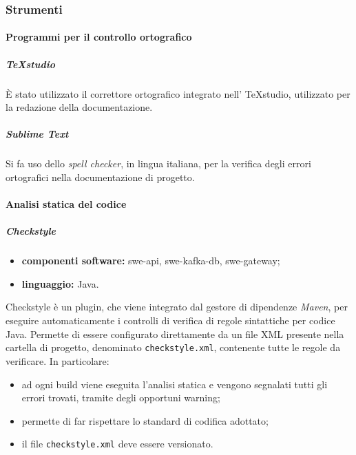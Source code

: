         \subsubsection{Strumenti}

            \paragraph{Programmi per il controllo ortografico}

                \subparagraph{TeXstudio}
                	È stato utilizzato il correttore ortografico integrato nell' TeXstudio, utilizzato per la redazione della documentazione.

                \subparagraph{Sublime Text}
                    Si fa uso dello \textit{spell checker}, in lingua italiana, per la verifica degli errori ortografici nella documentazione di progetto.

            \paragraph{Analisi statica del codice}

                \subparagraph{Checkstyle}

	                \begin{itemize}
	                    \item \textbf{componenti software:} swe-api, swe-kafka-db, swe-gateway;
	                    \item \textbf{linguaggio:} Java.
	                \end{itemize}
	                
	                Checkstyle è un plugin, che viene integrato dal gestore di dipendenze \textit{Maven}, per eseguire automaticamente i controlli di verifica di regole sintattiche per codice Java.
	                \newline
	                Permette di essere configurato direttamente da un file XML presente nella cartella di progetto, denominato \verb!checkstyle.xml!, contenente tutte le regole da verificare. In particolare:
	                \begin{itemize}
	                    \item ad ogni build viene eseguita l'analisi statica e vengono segnalati tutti gli errori trovati, tramite degli opportuni warning;
	                    \item permette di far rispettare lo standard di codifica adottato;
	                    \item il file \verb!checkstyle.xml! deve essere versionato.
	                \end{itemize}

